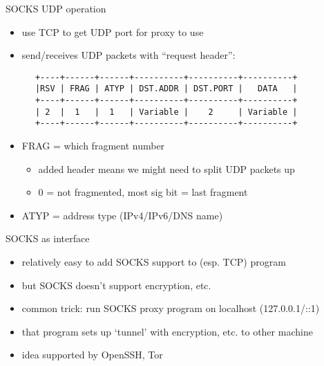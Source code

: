 \begin{frame}[fragile,label=udpSocks]{SOCKS UDP operation}
    \begin{itemize}
    \item use TCP to get UDP port for proxy to use
    \item send/receives UDP packets with ``request header'':
    \end{itemize}
\begin{Verbatim}
      +----+------+------+----------+----------+----------+
      |RSV | FRAG | ATYP | DST.ADDR | DST.PORT |   DATA   |
      +----+------+------+----------+----------+----------+
      | 2  |  1   |  1   | Variable |    2     | Variable |
      +----+------+------+----------+----------+----------+
\end{Verbatim}
    \begin{itemize}
    \item FRAG = which fragment number
        \begin{itemize}
        \item added header means we might need to split UDP packets up
        \item 0 = not fragmented, most sig bit = last fragment
        \end{itemize}
    \item ATYP = address type (IPv4/IPv6/DNS name)
    \end{itemize}
\end{frame}

\begin{frame}{SOCKS as interface}
    \begin{itemize}
    \item relatively easy to add SOCKS support to (esp. TCP) program
    \item but SOCKS doesn't support encryption, etc.
    \vspace{.5cm}
    \item common trick: run SOCKS proxy program on localhost (127.0.0.1/::1)
    \item that program sets up `tunnel' with encryption, etc. to other machine
    \vspace{.5cm}
    \item idea supported by OpenSSH, Tor
    \end{itemize}
\end{frame}
